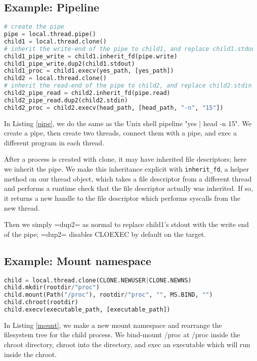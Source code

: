 \documentclass{acmart}
\begin{document}
\subsection{Example: Pipeline}
\begin{lstlisting}[float,language=Python,label={pipe},caption={Creating a pipeline}]
# create the pipe
pipe = local.thread.pipe()
child1 = local.thread.clone()
# inherit the write-end of the pipe to child1, and replace child1.stdout with it
child1_pipe_write = child1.inherit_fd(pipe.write)
child1_pipe_write.dup2(child1.stdout)
child1_proc = child1.execv(yes_path, [yes_path])
child2 = local.thread.clone()
# inherit the read-end of the pipe to child2, and replace child2.stdin with it
child2_pipe_read = child2.inherit_fd(pipe.read)
child2_pipe_read.dup2(child2.stdin)
child2_proc = child2.execv(head_path, [head_path, "-n", "15"])
\end{lstlisting}
In Listing \ref{pipe},
we do the same as the Unix shell pipeline "yes | head -n 15".
We create a pipe,
then create two threads,
connect them with a pipe,
and exec a different program in each thread.

After a process is created with clone,
it may have inherited file descriptors;
here we inherit the pipe.
We make this inheritance explicit with \texttt{inherit\_fd},
a helper method on our thread object,
which takes a file descriptor from a different thread
and performs a runtime check that the file descriptor actually was inherited.
If so, it returns a new handle to the file descriptor which performs syscalls from the new thread.

Then we simply =dup2= as normal to replace child1's stdout with the write end of the pipe;
=dup2= disables CLOEXEC by default on the target.
\subsection{Example: Mount namespace}
\begin{lstlisting}[float,language=Python,label={mount},caption={Mount namespace}]
child = local.thread.clone(CLONE.NEWUSER|CLONE.NEWNS)
child.mkdir(rootdir/"proc")
child.mount(Path("/proc"), rootdir/"proc", "", MS.BIND, "")
child.chroot(rootdir)
child.execv(executable_path, [executable_path])
\end{lstlisting}
In Listing \ref{mount},
we make a new mount namespace and rearrange the filesystem tree for the child process.
We bind-mount /proc at /proc inside the chroot directory,
chroot into the directory,
and exec an executable which will run inside the chroot.
\end{document}
